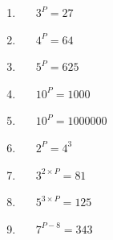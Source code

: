 \documentclass[a4paper,12pt]{article}
\begin{document}
\begin{tcolorbox}[colback=red!0!white, colframe=gray ,title=\subsubsection{Find the value of P in these exponent equations.}\label{exp2}]
	\begin{multicols}{3}
		\begin{enumerate}[label=\footnotesize \roman*)]
			\item~~~$\displaystyle 3^P=27$
			\item~~~$\displaystyle 4^P=64$
			\item~~~$\displaystyle 5^P=625$
			\item~~~$\displaystyle 10^P=1000$
			\item~~~$\displaystyle 10^P=1000000$
			\item~~~$\displaystyle 2^P=4^3$
			\item~~~$\displaystyle 3^{2 \times P}=81$
			\item~~~$\displaystyle 5^{3 \times P}=125$
			\item~~~$\displaystyle 7^{P-8}=343$
		\end{enumerate}
	\end{multicols}
\end{tcolorbox}\vspace{1.75cm}
\end{document}
